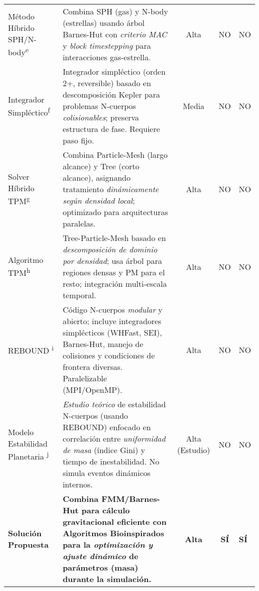 \begin{ThreePartTable}
\begin{longtable}{@{}p{0.75\firstcolwidth}p{0.85\desccolwidth}ccp{2.25cm}@{}}
    \addlinespace[3pt]
    Método Híbrido SPH/N-body\textsuperscript{e}
    & Combina SPH (gas) y N-body (estrellas) usando árbol Barnes-Hut con \textit{criterio MAC} y \textit{block timestepping} para interacciones gas-estrella.
    & Alta
    & NO
    & NO \\

    \addlinespace[3pt]
    Integrador Simpléctico\textsuperscript{f}
    & Integrador simpléctico (orden 2+, reversible) basado en descomposición Kepler para problemas N-cuerpos \textit{colisionables}; preserva estructura de fase. Requiere paso fijo.
    & Media
    & NO
    & NO \\

    \addlinespace[3pt]
    Solver Híbrido TPM\textsuperscript{g}
    & Combina Particle-Mesh (largo alcance) y Tree (corto alcance), asignando tratamiento \textit{dinámicamente según densidad local}; optimizado para arquitecturas paralelas.
    & Alta
    & NO
    & NO \\

    \addlinespace[3pt]
    Algoritmo TPM\textsuperscript{h}
    & Tree-Particle-Mesh basado en \textit{descomposición de dominio por densidad}; usa árbol para regiones densas y PM para el resto; integración multi-escala temporal.
    & Alta
    & NO
    & NO \\

    \addlinespace[3pt]
    REBOUND \textsuperscript{i}
    & Código N-cuerpos \textit{modular} y abierto; incluye integradores simplécticos (WHFast, SEI), Barnes-Hut, manejo de colisiones y condiciones de frontera diversas. Paralelizable (MPI/OpenMP).
    & Alta
    & NO
    & NO \\

    \addlinespace[3pt]
    Modelo Estabilidad Planetaria \textsuperscript{j}
    & \textit{Estudio teórico} de estabilidad N-cuerpos (usando REBOUND) enfocado en correlación entre \textit{uniformidad de masa} (índice Gini) y tiempo de inestabilidad. No simula eventos dinámicos internos.
    & Alta (Estudio)
    & NO
    & NO \\

    \midrule
    \textbf{Solución Propuesta}
    & \textbf{Combina FMM/Barnes-Hut para cálculo gravitacional eficiente con Algoritmos Bioinspirados para la \textit{optimización y ajuste dinámico} de parámetros (masa) durante la simulación.}
    & \textbf{Alta}
    & \textbf{SÍ}
    & \textbf{SÍ} \\

\end{longtable}
\end{ThreePartTable}